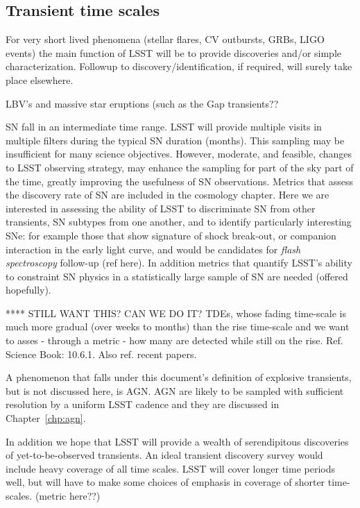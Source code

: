 \subsection{Transient time scales}

For very short lived phenomena (stellar flares, CV outbursts, GRBs,
LIGO events) the main function of LSST will be to provide discoveries
and/or simple characterization.  Followup to discovery/identification,
if required, will surely take place elsewhere.

LBV's and massive star eruptions (such as the 
Gap transients??

SN fall in an intermediate time range.  LSST will provide
multiple visits in multiple filters during the typical SN duration
(months).  This sampling may be insufficient for many science
objectives.  However, moderate, and feasible, changes to LSST
observing strategy, may enhance the sampling for part of the sky part
of the time, greatly improving the usefulness of SN observations. 
Metrics that assess the discovery rate of SN are included in the
cosmology chapter. Here we are interested in assessing the ability of
LSST to discriminate SN from other transients, SN subtypes from one
another, and to identify particularly interesting SNe: for example
those that show signature of shock break-out, or companion interaction
in the early light curve, and would be candidates for \emph{flash
  spectroscopy} follow-up (ref here). In addition metrics that
quantify LSST's ability to constraint SN physics in a statistically
large sample of SN are needed (offered hopefully).


**** STILL WANT THIS? CAN WE DO IT?
TDEs, whose fading time-scale is much more gradual
(over weeks to months) than the rise time-scale and we want to asses -
through a metric - how many are detected while still on the
rise. Ref. Science Book: 10.6.1. Also ref. recent papers.

A phenomenon that falls under this document's definition of explosive
transients, but is not discussed here, is AGN. AGN are likely to be
sampled with sufficient resolution by a uniform LSST cadence and they
are discussed in Chapter~\ref{chp:agn}.

In addition we hope that LSST will provide a wealth of serendipitous
discoveries of yet-to-be-observed transients.  An ideal transient
discovery survey would include heavy coverage of all time scales. LSST
will cover longer time periods well, but will have to make some
choices of emphasis in coverage of shorter time-scales. (metric
here??)


